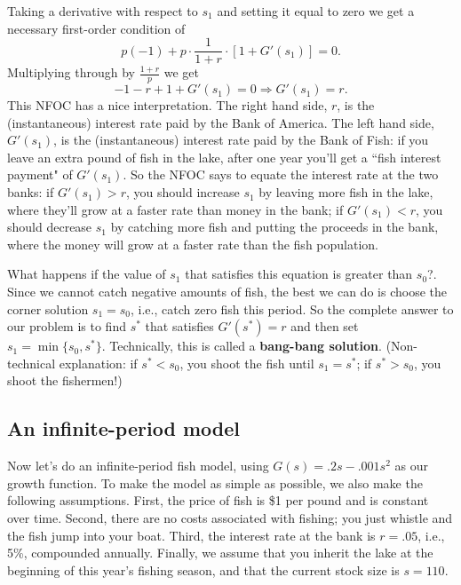 Taking a derivative with respect to $s_1$ and setting it equal to zero we get a necessary first-order condition of
\[
p(-1)+p\cdot\frac{1}{1+r}\cdot\left[1+G'(s_1)\right]=0.
\]
Multiplying through by $\displaystyle \frac{1+r}{p}$ we get
\[
-1-r + 1+G'(s_1)=0 \Longrightarrow G'(s_1)=r.
\]
This NFOC has a nice interpretation. The right hand side, $r$, is the (instantaneous) interest rate paid by the Bank of America. The left hand side, $G'(s_1)$, is the (instantaneous) interest rate paid by the Bank of Fish: if you leave an extra pound of fish in the lake, after one year you'll get a ``fish interest payment" of $G'(s_1)$. So the NFOC says to equate the interest rate at the two banks: if $G'(s_1)>r$, you should increase $s_1$ by leaving more fish in the lake, where they'll grow at a faster rate than money in the bank; if $G'(s_1)<r$, you should decrease $s_1$ by catching more fish and putting the proceeds in the bank, where the money will grow at a faster rate than the fish population.

What happens if the value of $s_1$ that satisfies this equation is greater than $s_0$?. Since we cannot catch negative amounts of fish, the best we can do is choose the corner solution $s_1=s_0$, i.e., catch zero fish this period. So the complete answer to our problem is to find $s^*$ that satisfies $G'(s^*)=r$ and then set $s_1=\min\{s_0, s^*\}$. Technically, this is called a \textbf{bang-bang solution}. (Non-technical explanation: if $s^*<s_0$, you shoot the fish until $s_1=s^*$; if $s^*>s_0$, you shoot the fishermen!)

\subsection*{An infinite-period model}

Now let's do an infinite-period fish model, using $G(s)=.2s - .001s^2$ as our growth function. To make the model as simple as possible, we also make the following assumptions. First, the price of fish is \$1 per pound and is constant over time. Second, there are no costs associated with fishing; you just whistle and the fish jump into your boat. Third, the interest rate at the bank is $r=.05$, i.e., 5\%, compounded annually. Finally, we assume that you inherit the lake at the beginning of this year's fishing season, and that the current stock size is $s=110$.


